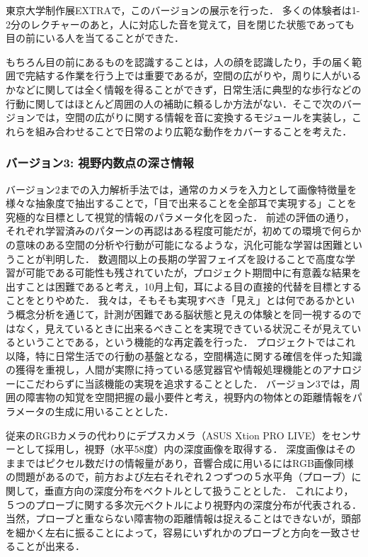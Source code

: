 
東京大学制作展EXTRAで，このバージョンの展示を行った．
多くの体験者は1-2分のレクチャーのあと，人に対応した音を覚えて，目を閉じた状態であっても目の前にいる人を当てることができた．

もちろん目の前にあるものを認識することは，人の顔を認識したり，手の届く範囲で完結する作業を行う上では重要であるが，空間の広がりや，周りに人がいるかなどに関しては全く情報を得ることができず，日常生活に典型的な歩行などの行動に関してはほとんど周囲の人の補助に頼るしか方法がない．そこで次のバージョンでは，空間の広がりに関する情報を音に変換するモジュールを実装し，これらを組み合わせることで日常のより広範な動作をカバーすることを考えた．

\subsubsection{バージョン3: 視野内数点の深さ情報}

バージョン2までの入力解析手法では，通常のカメラを入力として画像特徴量を様々な抽象度で抽出することで，「目で出来ることを全部耳で実現する」ことを究極的な目標として視覚的情報のパラメータ化を図った．
前述の評価の通り，それぞれ学習済みのパターンの再認はある程度可能だが，初めての環境で何らかの意味のある空間の分析や行動が可能になるような，汎化可能な学習は困難ということが判明した．
数週間以上の長期の学習フェイズを設けることで高度な学習が可能である可能性も残されていたが，プロジェクト期間中に有意義な結果を出すことは困難であると考え，10月上旬，耳による目の直接的代替を目標とすることをとりやめた．
我々は，そもそも実現すべき「見え」とは何であるかという概念分析を通じて，計測が困難である脳状態と見えの体験とを同一視するのではなく，見えているときに出来るべきことを実現できている状況こそが見えているということである，という機能的な再定義を行った．
プロジェクトではこれ以降，特に日常生活での行動の基盤となる，空間構造に関する確信を伴った知識の獲得を重視し，人間が実際に持っている感覚器官や情報処理機能とのアナロジーにこだわらずに当該機能の実現を追求することとした．
バージョン3では，周囲の障害物の知覚を空間把握の最小要件と考え，視野内の物体との距離情報をパラメータの生成に用いることとした．

従来のRGBカメラの代わりにデプスカメラ（ASUS Xtion PRO LIVE）をセンサーとして採用し，視野（水平58度）内の深度画像を取得する．
深度画像はそのままではピクセル数だけの情報量があり，音響合成に用いるにはRGB画像同様の問題があるので，前方および左右それぞれ２つずつの５水平角（プローブ）に関して，垂直方向の深度分布をベクトルとして扱うこととした．
これにより，５つのプローブに関する多次元ベクトルにより視野内の深度分布が代表される．
当然，プローブと重ならない障害物の距離情報は捉えることはできないが，頭部を細かく左右に振ることによって，容易にいずれかのプローブと方向を一致させることが出来る．

